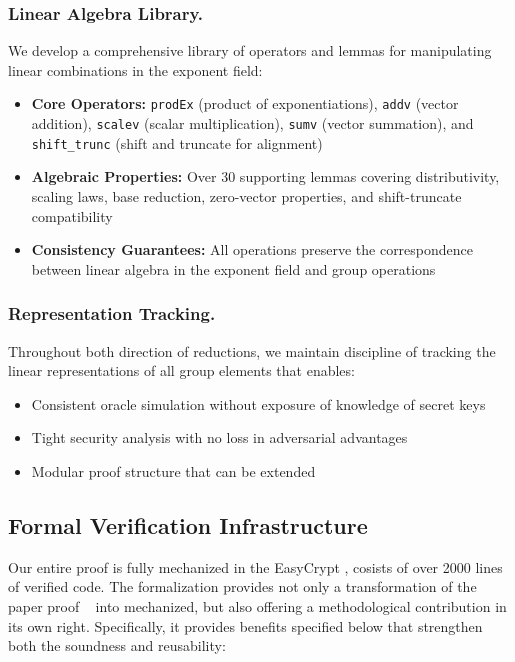 \subsubsection{Linear Algebra Library.} We develop a comprehensive library of operators and lemmas for manipulating linear combinations in the exponent field:
\begin{itemize}
\item \textbf{Core Operators:} \texttt{prodEx} (product of exponentiations), \texttt{addv} (vector addition), \texttt{scalev} (scalar multiplication), \texttt{sumv} (vector summation), and \texttt{shift\_trunc} (shift and truncate for alignment)
\item \textbf{Algebraic Properties:} Over 30 supporting lemmas covering distributivity, scaling laws, base reduction, zero-vector properties, and shift-truncate compatibility
\item \textbf{Consistency Guarantees:} All operations preserve the correspondence between linear algebra in the exponent field and group operations
\end{itemize}

\subsubsection{Representation Tracking.} Throughout both direction of reductions, we maintain discipline of tracking the linear representations of all group elements that enables:
\begin{itemize}
\item Consistent oracle simulation without exposure of knowledge of secret keys
\item Tight security analysis with no loss in adversarial advantages
\item Modular proof structure that can be extended 
\end{itemize}
















\subsection{Formal Verification Infrastructure}

Our entire proof is fully mechanized in the EasyCrypt , cosists of over 2000 lines of verified code. The formalization provides not only a transformation of the paper proof ~\cite{fuchsbauer2018} into mechanized, but also offering a methodological contribution in its own right. Specifically, it provides benefits specified below that strengthen both the soundness and reusability:



